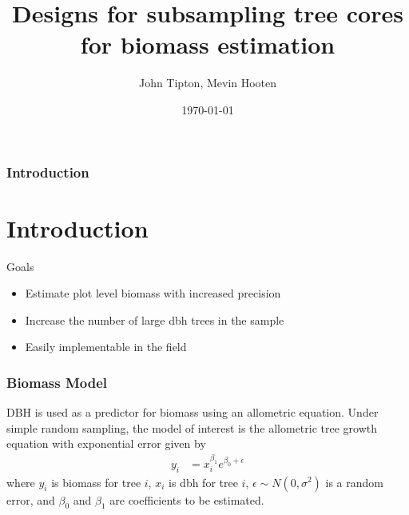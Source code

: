 \documentclass{beamer}
\title{Designs for subsampling tree cores for biomass estimation}
\author{John Tipton, Mevin Hooten }
\date{\today}
\begin{document}
%
\begin{frame}
  \maketitle
\end{frame}
%
\begin{frame}
  \frametitle{Introduction}
  \section{Introduction}
  Goals
  \begin{itemize}
    \item Estimate plot level biomass with increased precision \vspace{3mm}
    \item Increase the number of large dbh trees in the sample \vspace{3mm}
    \item Easily implementable in the field
  \end{itemize}
\end{frame}
%
\begin{frame}
  \frametitle{Biomass Model}
  DBH is used as a predictor for biomass using an allometric equation.   Under simple random sampling, the model of interest is the allometric tree growth equation with exponential error given by 
  \begin{align}
  \label{1}
     y_i & =  x_i^{\beta_1} e^{\beta_0 + \epsilon}
  \end{align}
  where $y_i$ is biomass for tree $i$, $x_i$ is dbh for tree $i$, $\epsilon \sim N(0, \sigma^2)$ is a random error, and $\beta_0$ and $\beta_1$ are coefficients to be estimated.
\end{frame}
%
\end{document}
